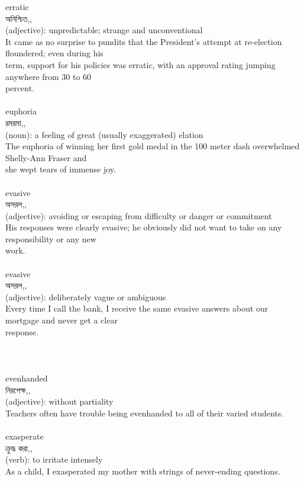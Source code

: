 \documentclass{article}
\begin{document}
{erratic}\\
{অনিশ্চিত,,}\\
{(adjective): unpredictable; strange and unconventional\\It came as no surprise to pundits that the President's attempt at re-election floundered; even during his\\term, support for his policies was erratic, with an approval rating jumping anywhere from 30 to 60\\percent.\\}\\
{euphoria}\\
{রমরমা,,}\\
{(noun): a feeling of great (usually exaggerated) elation\\The euphoria of winning her first gold medal in the 100 meter dash overwhelmed Shelly-Ann Fraser and\\she wept tears of immense joy.\\}\\
{evasive}\\
{অসরল,,}\\
{(adjective): avoiding or escaping from difficulty or danger or commitment\\His responses were clearly evasive; he obviously did not want to take on any responsibility or any new\\work.\\}\\
{evasive}\\
{অসরল,,}\\
{(adjective): deliberately vague or ambiguous\\Every time I call the bank, I receive the same evasive answers about our mortgage and never get a clear\\response.\\\\                                                                                \\}\\
{evenhanded}\\
{নিরপেক্ষ,,}\\
{(adjective): without partiality\\Teachers often have trouble being evenhanded to all of their varied students.\\}\\
{exasperate}\\
{ক্রুদ্ধ করা,,}\\
{(verb): to irritate intensely\\As a child, I exasperated my mother with strings of never-ending questions.\\}\\
\end{document}
